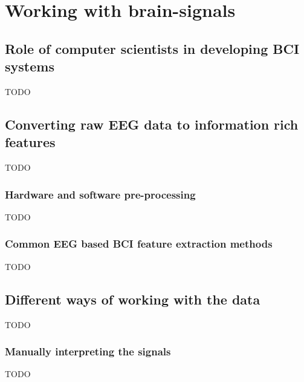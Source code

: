 
\glsresetall

\chapter{Working with brain-signals}
\label{ch:processing_signals}


\section{Role of computer scientists in developing BCI systems}
\label{sec:processing_signals_why_cs}
TODO


\section{Converting raw EEG data to information rich features}
\label{sec:processing_signals_useful_data}
TODO



\subsection{Hardware and software pre-processing}
\label{subsec:processing_signals_useful_data_preproc}
TODO



\subsection{Common EEG based BCI feature extraction methods}
\label{subsec:processing_signals_useful_data_feature}
TODO


\section{Different ways of working with the data}
\label{sec:processing_signals_interpreting}
TODO


\subsection{Manually interpreting the signals}
\label{subsec:processing_signals_interpreting_manual}
TODO


